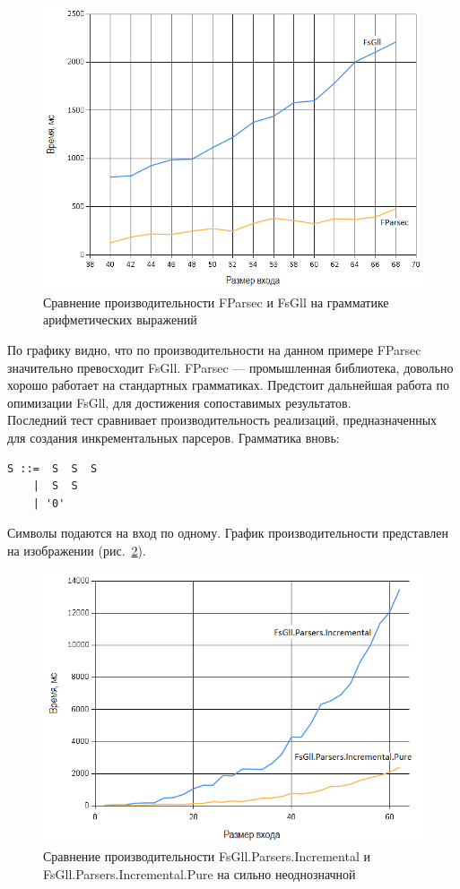 \documentclass[14pt]{matmex-diploma}
\begin{document}
\begin{figure}[!h]
  \label{ec_fparsec_fsgll_1}
  \centering
  \includegraphics[width=15cm]{pics/graph2.png}
  \caption{Сравнение производительности FParsec и FsGll на грамматике арифметических выражений}
\end{figure}
\FloatBarrier

По графику видно, что по производительности на данном примере FParsec значительно превосходит FsGll. FParsec --- промышленная библиотека, довольно хорошо работает на стандартных грамматиках. Предстоит дальнейшая работа по опимизации FsGll, для достижения сопоставимых результатов.
\\
Последний тест сравнивает производительность реализаций, предназначенных для создания 
инкрементальных парсеров. Грамматика вновь:
\begin{lstlisting}
S ::=  S  S  S 
    |  S  S 
    | '0'
\end{lstlisting}
Символы подаются на вход по одному. 
График производительности представлен на изображении (рис.~\ref{nnn_fsgll_incr}). \\

	
\begin{figure}[!h]
  \label{nnn_fsgll_incr}
  \centering
  \includegraphics[width=15cm]{pics/graph3.png}
  \caption{Сравнение производительности FsGll.Parsers.Incremental и FsGll.Parsers.Incremental.Pure на сильно неоднозначной}
\end{figure}
\FloatBarrier
\end{document}
